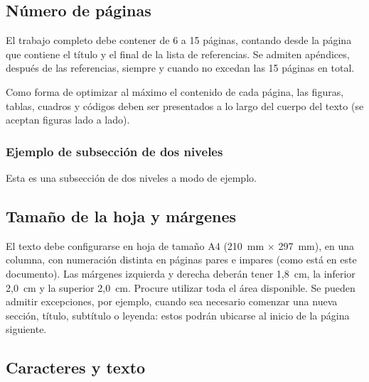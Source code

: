 \subsection{Número de páginas}

El trabajo completo debe contener de 6 a 15 páginas, contando desde la página que contiene el título y el final de la lista de referencias. Se admiten apéndices, después de las referencias, siempre y cuando no excedan las 15 páginas en total.

Como forma de optimizar al máximo el contenido de cada página, las figuras, tablas, cuadros y códigos deben ser presentados a lo largo del cuerpo del texto (se aceptan figuras lado a lado).

\subsubsection{Ejemplo de subsección de dos niveles}

Esta es una subsección de dos niveles a modo de ejemplo.

\subsection{Tamaño de la hoja y márgenes}

El texto debe configurarse en hoja de tamaño A4 (210~mm $\times$ 297~mm), en una columna, con numeración distinta en páginas pares e impares (como está en este documento). Las márgenes izquierda y derecha deberán tener 1,8~cm, la inferior 2,0~cm y la superior 2,0~cm. Procure utilizar toda el área disponible. Se pueden admitir excepciones, por ejemplo, cuando sea necesario comenzar una nueva sección, título, subtítulo o leyenda: estos podrán ubicarse al inicio de la página siguiente.

\subsection{Caracteres y texto}


